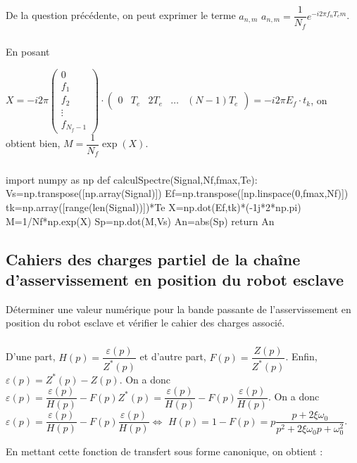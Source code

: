 \documentclass[10pt,fleqn]{article} %
\begin{document}
\subparagraph{} %
De la question précédente, on peut exprimer le terme $a_{n,m}$ 
$a_{n,m}=\dfrac{1}{N_f}e^{-i2\pi f_{n}T_em}$.


\subparagraph{} %

En posant 

$
X=-i2\pi
\left(
\begin{array}{c}
0\\
f_1\\
f_2\\
\vdots\\
f_{N_f-1}
\end{array}
\right)
\cdot
\left(
\begin{array}{ccccc}
0& T_e & 2T_e &\ldots & (N-1)T_e
\end{array}
\right)
=-i2\pi E_f\cdot t_k
$, on obtient bien, $
M=\dfrac{1}{N_f}\exp(X)$.

\subparagraph{} %

\begin{python}
import numpy as np
def calculSpectre(Signal,Nf,fmax,Te):
    Vs=np.transpose([np.array(Signal)])
    Ef=np.transpose([np.linspace(0,fmax,Nf)])
    tk=np.array([range(len(Signal))])*Te
    X=np.dot(Ef,tk)*(-1j*2*np.pi)
    M=1/Nf*np.exp(X)
    Sp=np.dot(M,Vs)
    An=abs(Sp)
    return An
\end{python}

\subsection{Cahiers des charges partiel de la chaîne d'asservissement en position du robot esclave}

\begin{obj}
Déterminer une valeur numérique pour la bande passante de l’asservissement en position du robot
esclave et vérifier le cahier des charges associé.
\end{obj}

\subparagraph{}	

D'une part, $H(p)=\dfrac{\varepsilon (p)}{Z^*(p)}$ et d'autre part, $F(p)=\dfrac{Z (p)}{Z^*(p)}$. Enfin, $\varepsilon(p)=Z^*(p)-Z(p)$. On a donc $\varepsilon(p)=\dfrac{\varepsilon(p)}{H(p)} - F(p)Z^*(p)=\dfrac{\varepsilon(p)}{H(p)} - F(p)\dfrac{\varepsilon(p)}{H(p)}$. On a donc  $\varepsilon(p)=\dfrac{\varepsilon(p)}{H(p)} - F(p)\dfrac{\varepsilon(p)}{H(p)} \Leftrightarrow $ $H(p)=1 - F(p)= p\dfrac{p+2\xi\omega_0  }{p^2+2\xi\omega_0 p + \omega_0^2}$.


En mettant cette fonction de transfert sous forme canonique, on  obtient : 
\end{document}
